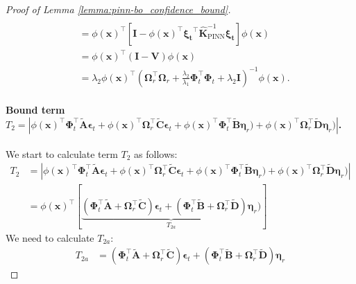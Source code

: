 \begin{proof}[Proof of Lemma \ref{lemma:pinn-bo_confidence_bound}]
\begin{align}
\\ 
            & = \phi(\mathbf{x})^\top \left[\mathbf{I} - \phi(\mathbf{x})^\top \boldsymbol{\boldsymbol{\xi}_t}^\top \mathbf{\widehat{K}}_\mathrm{PINN}^{-1} \boldsymbol{\boldsymbol{\xi}_t}\right] \phi(\mathbf{x}) \nonumber
\\
            & = \phi(\mathbf{x})^\top (\mathbf{I} - \mathbf{V}) \phi(\mathbf{x})  \nonumber
\\
            &  = \lambda_2 \phi(\mathbf{x})^\top\left(\boldsymbol{\Omega}_r^\top\boldsymbol{\Omega}_r+\frac{\lambda_2} {\lambda_1} \boldsymbol{\Phi}_t^\top \boldsymbol{\Phi}_t+ \lambda_2 \mathbf{I}\right)^{-1} \phi(\mathbf{x}). \label{Eqn:sigma_f_by_V}
    \end{align}
    \paragraph{Bound term \\ $T_2=  \left\lvert \phi(\mathbf{x})^\top \boldsymbol{\Phi}_t^\top \widetilde{\mathbf{A}}\boldsymbol{\epsilon}_t +  \phi(\mathbf{x})^\top \boldsymbol{\Omega}_r^\top \widetilde{\mathbf{C}}\boldsymbol{\epsilon}_t +  \phi(\mathbf{x})^\top \boldsymbol{\Phi}_t^\top \widetilde{\mathbf{B}}\boldsymbol{\eta}_r) + \phi(\mathbf{x})^\top \boldsymbol{\Omega}_r^\top \widetilde{\mathbf{D}}\boldsymbol{\eta}_r) \right\rvert$.\\} 
    We start to calculate term $T_2$ as follows:
    \begin{align*}
            T_2 &=\left\lvert \phi(\mathbf{x})^\top \boldsymbol{\Phi}_t^\top \widetilde{\mathbf{A}}\boldsymbol{\epsilon}_t +  \phi(\mathbf{x})^\top \boldsymbol{\Omega}_r^\top \widetilde{\mathbf{C}}\boldsymbol{\epsilon}_t +  \phi(\mathbf{x})^\top \boldsymbol{\Phi}_t^\top \widetilde{\mathbf{B}}\boldsymbol{\eta}_r) + \phi(\mathbf{x})^\top \boldsymbol{\Omega}_r^\top \widetilde{\mathbf{D}}\boldsymbol{\eta}_r) \right\rvert 
\\
            &= \phi(\mathbf{x})^\top\left[\underbrace{(\boldsymbol{\Phi}_t^\top \widetilde{\mathbf{A}} +  \boldsymbol{\Omega}_r^\top \widetilde{\mathbf{C}})\boldsymbol{\epsilon}_t + (\boldsymbol{\Phi}_t^\top\widetilde{\mathbf{B}} + \boldsymbol{\Omega}_r^\top\widetilde{\mathbf{D}}) \boldsymbol{\eta}_r)}_{T_{2a}} \right] 
    \end{align*}
   We need to calculate $T_{2a}$:
   \begin{align*}
       T_{2a} &= (\boldsymbol{\Phi}_t^\top \widetilde{\mathbf{A}} +  \boldsymbol{\Omega}_r^\top \widetilde{\mathbf{C}})\boldsymbol{\epsilon}_t + (\boldsymbol{\Phi}_t^\top\widetilde{\mathbf{B}} + \boldsymbol{\Omega}_r^\top\widetilde{\mathbf{D}}) \boldsymbol{\eta}_r 

\end{align*}
\end{proof}
